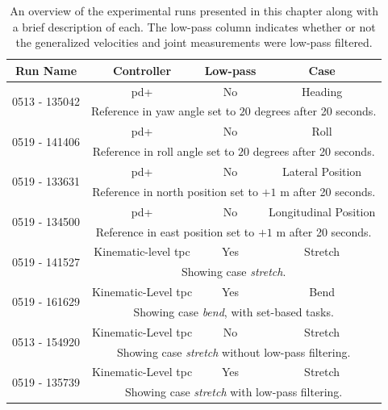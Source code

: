 \begin{table}[!ht]
    \centering
    \begin{tabular}{|c|c|c|c|}
        \hline
        Run Name & Controller & Low-pass & Case \\ \hline \hline
        \multirow{2}{*}{0513 - 135042} & \gls{pd+} & No & Heading \\ \cline{2-4}
        & \multicolumn{3}{p{0.75\linewidth}|}{Reference in yaw angle set to \(20\) degrees after 20 seconds.} \\ \hline
        \multirow{2}{*}{0519 - 141406} & \gls{pd+} & No & Roll \\ \cline{2-4}
        & \multicolumn{3}{p{0.75\linewidth}|}{Reference in roll angle set to \(20\) degrees after 20 seconds.} \\ \hline
        \multirow{2}{*}{0519 - 133631} & \gls{pd+} & No & Lateral Position \\ \cline{2-4}
        & \multicolumn{3}{p{0.75\linewidth}|}{Reference in north position set to \(+1\) m after 20 seconds.} \\ \hline
        \multirow{2}{*}{0519 - 134500} & \gls{pd+} & No & Longitudinal Position \\ \cline{2-4}
        & \multicolumn{3}{p{0.75\linewidth}|}{Reference in east position set to \(+1\) m after 20 seconds.} \\ \hline
        \hline
        \multirow{2}{*}{0519 - 141527} & Kinematic-level \gls{tpc} & Yes & Stretch \\ \cline{2-4}
        & \multicolumn{3}{p{0.75\linewidth}|}{Showing case \textit{stretch}.} \\ \hline
        \hline
        \multirow{2}{*}{0519 - 161629} & Kinematic-Level \gls{tpc} & Yes & Bend \\ \cline{2-4}
        & \multicolumn{3}{p{0.75\linewidth}|}{Showing case \textit{bend}, with set-based tasks.} \\ \hline
        \hline
        \multirow{2}{*}{0513 - 154920} & Kinematic-Level \gls{tpc} & No & Stretch \\ \cline{2-4}
        & \multicolumn{3}{p{0.75\linewidth}|}{Showing case \textit{stretch} without low-pass filtering.} \\ \hline
        \multirow{2}{*}{0519 - 135739} & Kinematic-Level \gls{tpc} & Yes & Stretch \\ \cline{2-4}
        & \multicolumn{3}{p{0.75\linewidth}|}{Showing case \textit{stretch} with low-pass filtering.} \\ \hline
    \end{tabular}
    \caption[An overview of the experimental runs]{An overview of the experimental
    runs presented in this chapter along with a brief description of each.
    The low-pass column indicates whether or not the generalized velocities and joint measurements were low-pass filtered.}
    \label{tab:eelume:experimental-runs}
\end{table}

